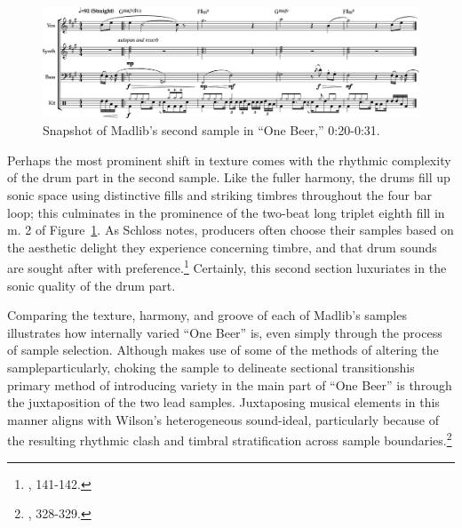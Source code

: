     \begin{figure}[ht]
        \centering
        \includegraphics[width=\textwidth]{images/figures/chp 02/020031onebeermain.pdf}
        \caption{Snapshot of Madlib's second sample in ``One Beer,'' 0:20-0:31.}
        \label{fig:onebeermain}
    \end{figure}

Perhaps the most prominent shift in texture comes with the rhythmic complexity of the drum part in the second sample. Like the fuller harmony, the drums fill up sonic space using distinctive fills and striking timbres throughout the four bar loop; this culminates in the prominence of the two-beat long triplet eighth fill in m. 2 of Figure~\ref{fig:onebeermain}. As Schloss notes, producers often choose their samples based on the aesthetic delight they experience concerning timbre, and that drum sounds are sought after with preference.\footnote{\cite{josephgschlossMakingBeatsArt2004}, 141-142.} Certainly, this second section luxuriates in the sonic quality of the drum part.

Comparing the texture, harmony, and groove of each of Madlib's samples illustrates how internally varied ``One Beer'' is, even simply through the process of sample selection. Although makes use of some of the methods of altering the sample\textemdash particularly, choking the sample to delineate sectional transitions\textemdash his primary method of introducing variety in the main part of ``One Beer'' is through the juxtaposition of the two lead samples. Juxtaposing musical elements in this manner aligns with Wilson's heterogeneous sound-ideal, particularly because of the resulting rhythmic clash and  timbral stratification across sample boundaries.\footnote{\cite{ollywilsonHeterogeneousSoundIdeal1992}, 328-329.}
